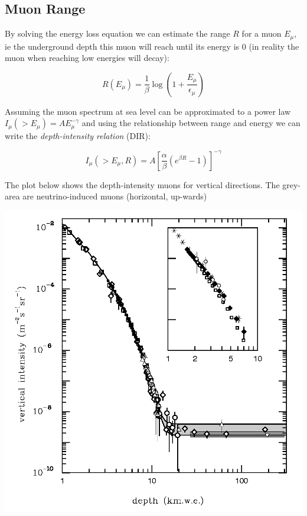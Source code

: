 \documentclass[
  letterpaper,
  DIV=11,
  numbers=noendperiod]{scrreprt}
\begin{document}
\subsection{Muon Range}\label{muon-range}

By solving the energy loss equation we can estimate the range \(R\) for
a muon \(E_\mu\), ie the underground depth this muon will reach until
its energy is 0 (in reality the muon when reaching low energies will
decay):

\[ R(E_\mu) = \frac{1}{\beta}\log\left( 1 + \frac{E_\mu}{\epsilon_\mu}\right)\]

Assuming the muon spectrum at sea level can be approximated to a power
law \(I_\mu(>E_\mu) = AE_\mu^{-\gamma}\) and using the relationship
between range and energy we can write the \emph{depth-intensity
relation} (DIR):

\[I_\mu(>E_\mu, R) = A\left[\frac{\alpha}{\beta}(e^{\beta R} - 1)\right]^{-\gamma}\]

The plot below shows the depth-intensity muons for vertical directions.
The grey-area are neutrino-induced muons (horizontal, up-wards)

\begin{center}
\includegraphics{images/muon-depth.png}
\end{center}
\end{document}
